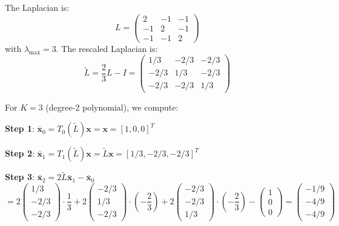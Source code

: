 \begin{notechapter}
\begin{example}
\begin{center}
\end{center}

The Laplacian is:
\[
L = \begin{pmatrix} 2 & -1 & -1 \\ -1 & 2 & -1 \\ -1 & -1 & 2 \end{pmatrix}
\]
with $\lambda_{\max} = 3$. The rescaled Laplacian is:
\[
\tilde{L} = \frac{2}{3}L - I = 
\begin{pmatrix} 1/3 & -2/3 & -2/3 \\ -2/3 & 1/3 & -2/3 \\ -2/3 & -2/3 & 1/3 \end{pmatrix}
\]

For $K=3$ (degree-2 polynomial), we compute:

\textbf{Step 1}: $\bar{\mathbf{x}}_0 = T_0(\tilde{L})\mathbf{x} = \mathbf{x} = [1, 0, 0]^T$

\textbf{Step 2}: $\bar{\mathbf{x}}_1 = T_1(\tilde{L})\mathbf{x} = \tilde{L}\mathbf{x} = [1/3, -2/3, -2/3]^T$

\textbf{Step 3}: $\bar{\mathbf{x}}_2 = 2\tilde{L}\bar{\mathbf{x}}_1 - \bar{\mathbf{x}}_0$
\[
= 2 \begin{pmatrix} 1/3 \\ -2/3 \\ -2/3 \end{pmatrix} \cdot \frac{1}{3}
+ 2 \begin{pmatrix} -2/3 \\ 1/3 \\ -2/3 \end{pmatrix} \cdot (-\frac{2}{3})
+ 2 \begin{pmatrix} -2/3 \\ -2/3 \\ 1/3 \end{pmatrix} \cdot (-\frac{2}{3})
- \begin{pmatrix} 1 \\ 0 \\ 0 \end{pmatrix}
= \begin{pmatrix} -1/9 \\ -4/9 \\ -4/9 \end{pmatrix}
\]


\end{example}
\end{notechapter}
